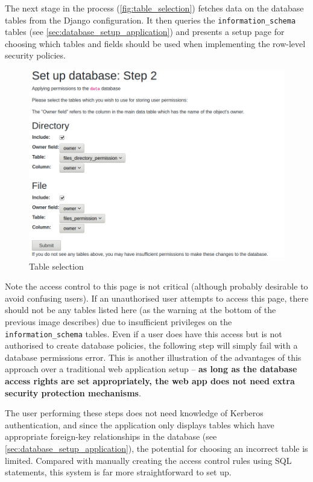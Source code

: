 \documentclass[12pt]{report}
\begin{document}
The next stage in the process (\autoref{fig:table_selection}) fetches data on the database tables from the Django configuration. It then queries the \verb+information_schema+ tables (see \autoref{sec:database_setup_application}) and presents a setup page for choosing which tables and fields should be used when implementing the row-level security policies.

\begin{figure}[ht]
  \begin{center}
    \includegraphics[width=\textwidth]{03-setup2.png}
  \end{center}
  \caption{Table selection}
  \label{fig:table_selection}
\end{figure}

Note the access control to this page is not critical (although probably desirable to avoid confusing users). If an unauthorised user attempts to access this page, there should not be any tables listed here (as the warning at the bottom of the previous image describes) due to insufficient privileges on the \verb+information_schema+ tables. Even if a user does have this access but is not authorised to create database policies, the following step will simply fail with a database permissions error. This is another illustration of the advantages of this approach over a traditional web application setup -- \textbf{as long as the database access rights are set appropriately, the web app does not need extra security protection mechanisms}.

The user performing these steps does not need knowledge of Kerberos authentication, and since the application only displays tables which have appropriate foreign-key relationships in the database (see \autoref{sec:database_setup_application}), the potential for choosing an incorrect table is limited. Compared with manually creating the access control rules using SQL statements, this system is far more straightforward to set up.
\end{document}
